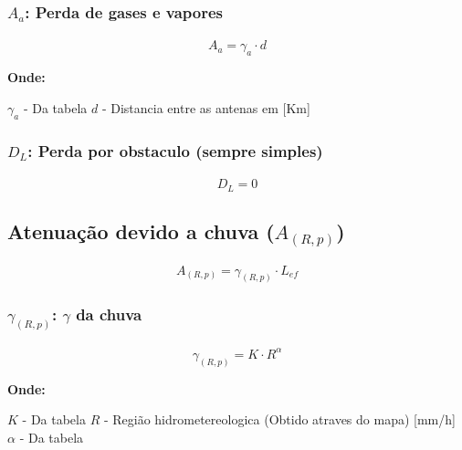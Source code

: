 \documentclass[11pt]{article} %
\begin{document}
\subsubsection{$A_{a}$: Perda de gases e vapores}

\paragraph{}

\begin{equation}
A_{a} = {\gamma}_{a} \cdot d
\end{equation}

\textbf{Onde:}

$\gamma_{a}$ - Da tabela \newline
$d$ - Distancia entre as antenas em [Km]

\subsubsection{$D_{L}$: Perda por obstaculo (sempre simples)}

\paragraph{}

\begin{equation}
D_{L} = 0
\end{equation}

\subsection{Atenuação devido a chuva ($A_{(R, p)}$)}

\paragraph{}

\begin{equation}
A_{(R, p)} = {\gamma}_{(R, p)} \cdot L_{ef}
\end{equation}

\subsubsection{${\gamma}_{(R, p)}$: $\gamma$ da chuva}

\paragraph{}

\begin{equation}
{\gamma}_{(R, p)} = K \cdot R^{\alpha}
\end{equation}

\textbf{Onde:}

$K$ - Da tabela \newline
$R$ - Região hidrometereologica (Obtido atraves do mapa) [mm/h] \newline
$\alpha$ - Da tabela
\end{document}
